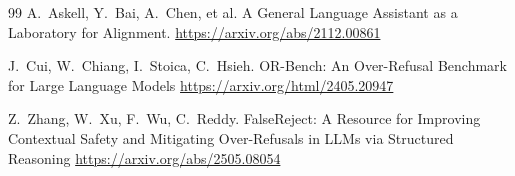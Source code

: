 \documentclass[a4paper, twocolumn, 9pt]{article}
\begin{document}
\begin{thebibliography}{99}
A.~Askell, Y.~Bai, A.~Chen, et al.
\newblock A General Language Assistant as a Laboratory for Alignment.
\newblock \url{https://arxiv.org/abs/2112.00861}

J.~Cui, W.~Chiang, I.~Stoica, C.~Hsieh.
\newblock OR-Bench: An Over-Refusal Benchmark for Large Language Models
\newblock \url{https://arxiv.org/html/2405.20947}

Z.~Zhang, W.~Xu, F.~Wu, C.~Reddy.
\newblock FalseReject: A Resource for Improving Contextual Safety and Mitigating Over-Refusals in LLMs via Structured Reasoning
\newblock \url{https://arxiv.org/abs/2505.08054}

\end{thebibliography}
\end{document}
